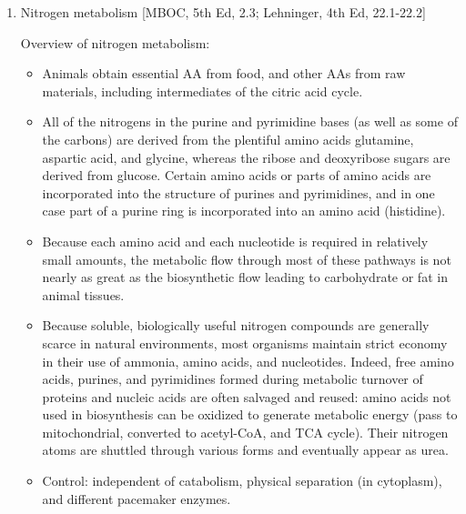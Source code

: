 \documentclass{report}
\begin{document}
\begin{enumerate}
\item{Nitrogen metabolism} [MBOC, 5th Ed, 2.3; Lehninger, 4th Ed, 22.1-22.2]
	

Overview of nitrogen metabolism: 
\begin{itemize}
	\item Animals obtain essential AA from food, and other AAs from raw materials, including intermediates of the citric acid cycle. 
	\item All of the nitrogens in the purine and pyrimidine bases (as well as some of the carbons) are derived from the plentiful amino acids glutamine, aspartic acid, and glycine, whereas the ribose and deoxyribose sugars are derived from glucose. Certain amino acids or parts of amino acids are incorporated into the structure of purines and pyrimidines, and in one case part of a purine ring is incorporated into an amino acid (histidine). 
	\item Because each amino acid and each nucleotide is required in relatively small amounts, the metabolic flow through most of these pathways is not nearly as great as the biosynthetic flow leading to carbohydrate or fat in animal tissues.
	\item Because soluble, biologically useful nitrogen compounds are generally scarce in natural environments, most organisms maintain strict economy in their use of ammonia, amino acids, and nucleotides. Indeed, free amino acids, purines, and pyrimidines formed during metabolic turnover of proteins and nucleic acids are often salvaged and reused: amino acids not used in biosynthesis can be oxidized to generate metabolic energy (pass to mitochondrial, converted to acetyl-CoA, and TCA cycle). Their nitrogen atoms are shuttled through various forms and eventually appear as urea.
	\item Control: independent of catabolism, physical separation (in cytoplasm), and different pacemaker enzymes. 
\end{itemize}


\end{enumerate}
\end{document}
